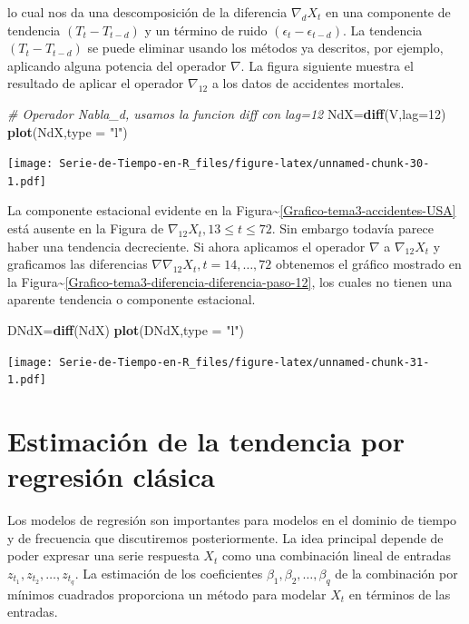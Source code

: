 \documentclass[12pt,]{krantz}
\makeatletter
\newenvironment{Shaded}{\begin{snugshade}}{\end{snugshade}}
\newcommand{\KeywordTok}[1]{\textcolor[rgb]{0.13,0.29,0.53}{\textbf{#1}}}
\newcommand{\DataTypeTok}[1]{\textcolor[rgb]{0.13,0.29,0.53}{#1}}
\newcommand{\DecValTok}[1]{\textcolor[rgb]{0.00,0.00,0.81}{#1}}
\newcommand{\StringTok}[1]{\textcolor[rgb]{0.31,0.60,0.02}{#1}}
\newcommand{\CommentTok}[1]{\textcolor[rgb]{0.56,0.35,0.01}{\textit{#1}}}
\newcommand{\NormalTok}[1]{#1}
\newenvironment{kframe}{%
\medskip{}
\setlength{\fboxsep}{.8em}
 \def\at@end@of@kframe{}%
 \ifinner\ifhmode%
  \def\at@end@of@kframe{\end{minipage}}%
  \begin{minipage}{\columnwidth}%
 \fi\fi%
 \def\FrameCommand##1{\hskip\@totalleftmargin \hskip-\fboxsep
 \colorbox{shadecolor}{##1}\hskip-\fboxsep
     \hskip-\linewidth \hskip-\@totalleftmargin \hskip\columnwidth}%
 \MakeFramed {\advance\hsize-\width
   \@totalleftmargin\z@ \linewidth\hsize
   \@setminipage}}%
 {\par\unskip\endMakeFramed%
 \at@end@of@kframe}
\renewenvironment{Shaded}{\begin{kframe}}{\end{kframe}}
\theoremstyle{definition}
\theoremstyle{definition}
\theoremstyle{definition}
\theoremstyle{remark}
\makeatother
\begin{document}
lo cual nos da una descomposición de la diferencia \(\nabla_dX_t\) en
una componente de tendencia \((T_t-T_{t-d})\) y un término de ruido
\((\epsilon_t-\epsilon_{t-d})\). La tendencia \((T_t-T_{t-d})\) se puede
eliminar usando los métodos ya descritos, por ejemplo, aplicando alguna
potencia del operador \(\nabla\). La figura siguiente muestra el
resultado de aplicar el operador \(\nabla_{12}\) a los datos de
accidentes mortales.

\begin{Shaded}
\begin{Highlighting}[]
\CommentTok{# Operador Nabla_d, usamos la funcion diff con lag=12}
\NormalTok{NdX=}\KeywordTok{diff}\NormalTok{(V,}\DataTypeTok{lag=}\DecValTok{12}\NormalTok{)}
\KeywordTok{plot}\NormalTok{(NdX,}\DataTypeTok{type =} \StringTok{"l"}\NormalTok{)}
\end{Highlighting}
\end{Shaded}

\texttt{[image: Serie-de-Tiempo-en-R\_files/figure-latex/unnamed-chunk-30-1.pdf]}

La componente estacional evidente en la
Figura\textasciitilde{}\ref{Grafico-tema3-accidentes-USA} está ausente
en la Figura de \(\nabla_{12}X_t,13\leq t\leq72\). Sin embargo todavía
parece haber una tendencia decreciente. Si ahora aplicamos el operador
\(\nabla\) a \(\nabla_{12}X_t\) y graficamos las diferencias
\(\nabla\nabla_{12}X_t,t=14,\ldots,72\) obtenemos el gráfico mostrado en
la
Figura\textasciitilde{}\ref{Grafico-tema3-diferencia-diferencia-paso-12},
los cuales no tienen una aparente tendencia o componente estacional.

\begin{Shaded}
\begin{Highlighting}[]
\NormalTok{DNdX=}\KeywordTok{diff}\NormalTok{(NdX)}
\KeywordTok{plot}\NormalTok{(DNdX,}\DataTypeTok{type =} \StringTok{"l"}\NormalTok{)}
\end{Highlighting}
\end{Shaded}

\texttt{[image: Serie-de-Tiempo-en-R\_files/figure-latex/unnamed-chunk-31-1.pdf]}

\section{Estimación de la tendencia por regresión
clásica}\label{estimacion-de-la-tendencia-por-regresion-clasica}

Los modelos de regresión son importantes para modelos en el dominio de
tiempo y de frecuencia que discutiremos posteriormente. La idea
principal depende de poder expresar una serie respuesta \(X_t\) como una
combinación lineal de entradas \(z_{t_1},z_{t_2},\ldots,z_{t_q}\). La
estimación de los coeficientes \(\beta_1,\beta_2,\ldots,\beta_q\) de la
combinación por mínimos cuadrados proporciona un método para modelar
\(X_t\) en términos de las entradas.
\end{document}
